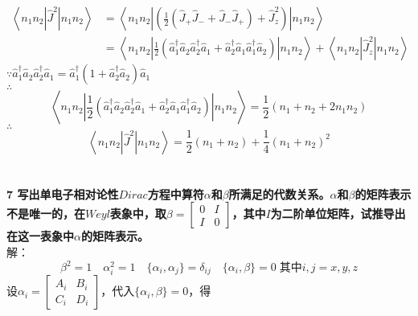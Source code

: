 \documentclass[12pt]{article}
\numberwithin{equation}{section}	 %
\begin{document}
\begin{spacing}{1.5}
\begin{equation}
\begin{aligned}
\left<n_{1}n_{2}\left| \hat{J}^{2} \right|n_{1}n_{2}\right> &= \left<n_{1}n_{2}\left|\left( \frac{1}{2}(\hat{J}_{+}\hat{J}_{-}+\hat{J}_{-}\hat{J}_{+})+\hat{J}_{z}^{2} \right)\right|n_{1}n_{2}\right>\\
&= \left<n_{1}n_{2}\left| \frac{1}{2} \left( \hat{a}^{\dagger}_{1}\hat{a}_{2}\hat{a}^{\dagger}_{2}\hat{a}_{1} + \hat{a}^{\dagger}_{2}\hat{a}_{1}\hat{a}^{\dagger}_{1}\hat{a}_{2} \right) \right|n_{1}n_{2}\right> + \left<n_{1}n_{2}\left| \hat{J}_{z}^{2} \right|n_{1}n_{2}\right>
\end{aligned}
\end{equation}
$\because \hat{a}^{\dagger}_{1}\hat{a}_{2}\hat{a}^{\dagger}_{2}\hat{a}_{1} = \hat{a}^{\dagger}_{1}(1+\hat{a}^{\dagger}_{2}\hat{a}_{2})\hat{a}_{1}$\\
$\therefore$
\begin{equation}
\left<n_{1}n_{2}\left| \frac{1}{2} \left( \hat{a}^{\dagger}_{1}\hat{a}_{2}\hat{a}^{\dagger}_{2}\hat{a}_{1} + \hat{a}^{\dagger}_{2}\hat{a}_{1}\hat{a}^{\dagger}_{1}\hat{a}_{2} \right) \right|n_{1}n_{2}\right> = \frac{1}{2}(n_{1}+n_{2}+2n_{1}n_{2})
\end{equation}
$\therefore$
\begin{equation}
\left<n_{1}n_{2}\left| \hat{J}^{2} \right|n_{1}n_{2}\right> = \frac{1}{2}(n_{1}+n_{2}) + \frac{1}{4}(n_{1}+n_{2})^{2}
\end{equation}
~\\
~\\
\textbf{7 \quad 写出单电子相对论性$Dirac$方程中算符$\alpha$和$\beta$所满足的代数关系。$\alpha$和$\beta$的矩阵表示不是唯一的，在$Weyl$表象中，取$\beta=\begin{bmatrix} 0 & I \\ I & 0 \end{bmatrix}$，其中$I$为二阶单位矩阵，试推导出在这一表象中$\alpha$的矩阵表示。}\\
解：
\begin{equation}\nonumber 		%
\beta^{2}=1 \quad \alpha_{i}^{2}=1 \quad \{\alpha_{i},\alpha_{j}\}=\delta_{ij} \quad \{\alpha_{i},\beta\}=0 \; \text{其中}i,j=x,y,z
\end{equation}
设$\alpha_{i}=\begin{bmatrix} A_{i} & B_{i} \\ C_{i} & D_{i} \end{bmatrix}$，代入$\{\alpha_{i},\beta\}=0$，得
\begin{equation}

\end{equation}
\end{spacing}
\end{document}
